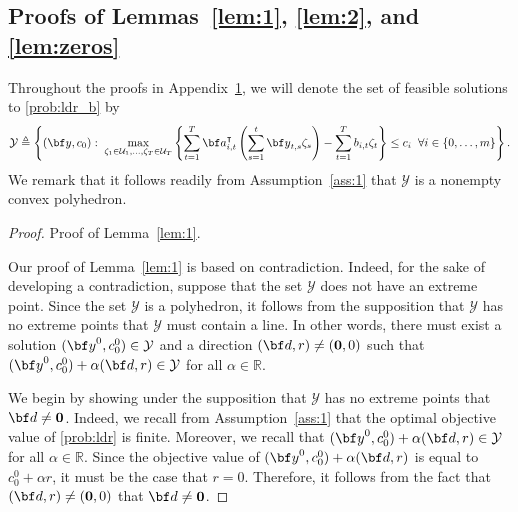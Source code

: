 \documentclass[nonblindrev,mnsc]{informs3} %
\newcommand{\ba}{{\bf a}}
\newcommand{\bd}{{\bf d}}
\newcommand{\by}{{\bf y}}
\def\Real{\mathbb{R}}
\let\R\Real
\newcommand{\bzero}{{\boldsymbol{0}}}
\begin{document}

 


\ECSwitch



\setlength{\parskip}{0em}

\begin{APPENDICES}


\section{Proofs of Lemmas~\ref{lem:1}, \ref{lem:2}, and \ref{lem:zeros}} \label{appx:3}
Throughout the proofs in Appendix~\ref{appx:3}, we will denote the set of feasible solutions to \eqref{prob:ldr_b} by 
\begin{align}\label{set}
\mathcal{Y} \triangleq \left \{ (\by,c_0): \;  \max_{\zeta_1 \in \mathcal{U}_1, \ldots,\zeta_T \in \mathcal{U}_T}  \left \{ \sum_{t=1}^T \ba_{i,t}^\intercal  \left(\sum_{s=1}^t \by_{t,s} \zeta_s \right) - \sum_{t=1}^T b_{i,t}   \zeta_t \right \}  \le c_i  \;\; \forall i \in \{0,\ldots,m\} \right \}.
\end{align}
We remark that it follows readily from Assumption~\ref{ass:1} that $\mathcal{Y}$ is a nonempty convex polyhedron. 
\begin{proof}{Proof of Lemma~\ref{lem:1}.}



Our proof of Lemma~\ref{lem:1} is based on contradiction. Indeed, for the sake of developing a contradiction, suppose that the set  $\mathcal{Y}$ does not have an extreme point. Since the set $\mathcal{Y}$ is a polyhedron, it follows from the supposition that $\mathcal{Y}$ has no extreme points that $\mathcal{Y}$ must contain  a line. In other words, there must exist a solution $(\by^0,c^0_0) \in \mathcal{Y}$  and a direction $(\bd, r) \neq (\bzero,0)$ such that $(\by^0,c_0^0)+\alpha (\bd,r) \in \mathcal{Y}$ for all $\alpha\in\R$. 

We begin by showing under the supposition that $\mathcal{Y}$ has no extreme points that $\bd \neq \bzero$. Indeed, we recall from Assumption~\ref{ass:1} that the optimal objective value of \eqref{prob:ldr} is finite. Moreover, we recall that $(\by^0,c_0^0)+\alpha (\bd,r) \in \mathcal{Y}$ for all $\alpha \in \R$. Since the objective value of $(\by^0,c_0^0)+\alpha (\bd,r)$   is equal to $c_0^0 + \alpha r$, it must be the case that $r = 0$. Therefore, it follows from the fact that $(\bd,r) \neq (\bzero,0)$ that $\bd \neq \bzero$.  


\end{proof}
\end{APPENDICES}
\end{document}
